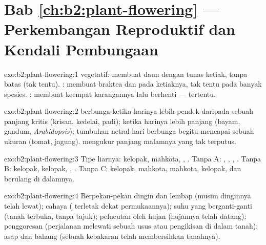 \section*{Bab \ref{ch:b2:plant-flowering} --- Perkembangan Reproduktif dan Kendali Pembungaan}

\begin{solution}{exo:b2:plant-flowering:1}
 vegetatif: membuat daun dengan tunas ketiak, tanpa batas (tak
tentu). : membuat braktea dan   pada
ketiaknya, tak tentu pada banyak spesies.  : membuat
keempat karangannya lalu berhenti --- tertentu.
\end{solution}

\begin{solution}{exo:b2:plant-flowering:2}
 berbunga ketika harinya lebih pendek daripada
sebuah panjang kritis (krisan, kedelai, padi); 
ketika harinya lebih panjang (bayam, gandum, \emph{Arabidopsis});
tumbuhan netral hari berbunga begitu mencapai sebuah ukuran (tomat,
jagung).  mengukur panjang malamnya yang tak
terputus.
\end{solution}

\begin{solution}{exo:b2:plant-flowering:3}
Tipe liarnya: kelopak, mahkota, , . Tanpa A: , , , . Tanpa B: kelopak, kelopak,
, . Tanpa C: kelopak, mahkota, mahkota, kelopak, dan
 berulang di dalamnya.
\end{solution}

\begin{solution}{exo:b2:plant-flowering:4}
Berpekan-pekan dingin dan lembap (musim dinginnya telah lewat); cahaya
( terletak dekat permukaannya); suhu yang berganti-ganti (tanah
terbuka, tanpa tajuk); pelucutan oleh hujan (hujannya telah datang);
penggoresan (perjalanan melewati sebuah usus atau pengikisan di dalam
tanah); asap dan bahang (sebuah kebakaran telah membersihkan tanahnya).
\end{solution}

